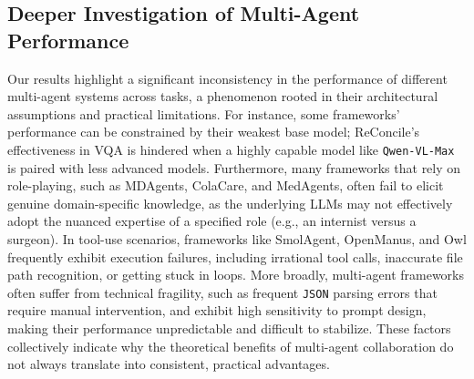 \documentclass{article}
\begin{document}
\subsection{Deeper Investigation of Multi-Agent Performance}
Our results highlight a significant inconsistency in the performance of different multi-agent systems across tasks, a phenomenon rooted in their architectural assumptions and practical limitations. For instance, some frameworks' performance can be constrained by their weakest base model; ReConcile's effectiveness in VQA is hindered when a highly capable model like \texttt{Qwen-VL-Max} is paired with less advanced models. Furthermore, many frameworks that rely on role-playing, such as MDAgents, ColaCare, and MedAgents, often fail to elicit genuine domain-specific knowledge, as the underlying LLMs may not effectively adopt the nuanced expertise of a specified role (e.g., an internist versus a surgeon). In tool-use scenarios, frameworks like SmolAgent, OpenManus, and Owl frequently exhibit execution failures, including irrational tool calls, inaccurate file path recognition, or getting stuck in loops. More broadly, multi-agent frameworks often suffer from technical fragility, such as frequent \texttt{JSON} parsing errors that require manual intervention, and exhibit high sensitivity to prompt design, making their performance unpredictable and difficult to stabilize. These factors collectively indicate why the theoretical benefits of multi-agent collaboration do not always translate into consistent, practical advantages.

% 
\end{document}
